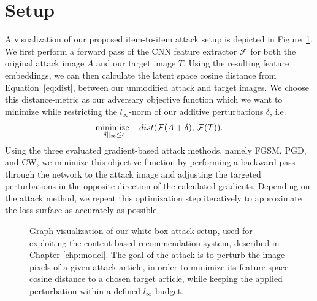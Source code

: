 \section{Setup}
A visualization of our proposed item-to-item attack setup is depicted in Figure~\ref{fig:attack-setup}.  We first perform a forward pass of the \acl{CNN} feature extractor $\mathcal{F}$ for both the original attack image $A$ and our target image $T$. Using the resulting feature embeddings, we can then calculate the latent space cosine distance from Equation~\ref{eq:dist}, between our unmodified attack and target images. We choose this distance-metric as our adversary objective function which we want to minimize while restricting the $l_\infty$-norm of our additive perturbations $\delta$, i.e.
\begin{equation}
\operatorname*{minimize}_{\|\delta\|_\infty \le \epsilon} \quad dist(\mathcal{F}(A + \delta),\,\mathcal{F}(T)).
\label{eq:adv-loss}
\end{equation}
Using the three evaluated gradient-based attack methods, namely \ac{FGSM}, \ac{PGD}, and \ac{CW}, we minimize this objective function by performing a backward pass through the network to the attack image and adjusting the targeted perturbations in the opposite direction of the calculated gradients. Depending on the attack method, we repeat this optimization step iteratively to approximate the loss surface as accurately as possible.
\begin{figure}[H]
  	\centering
  	
  	\caption{Graph visualization of our white-box attack setup, used for exploiting the content-based recommendation system, described in Chapter \ref{chp:model}. The goal of the attack is to perturb the image pixels of a given attack article, in order to minimize its feature space cosine distance to a chosen target article, while keeping the applied perturbation within a defined $l_\infty$ budget.}
  	\label{fig:attack-setup}
\end{figure}

